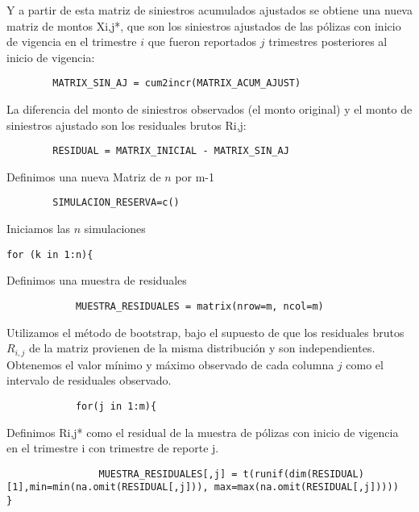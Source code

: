 \documentclass[11pt,twoside,openright,spanish]{report}
\numberwithin{equation}{chapter}
\numberwithin{figure}{chapter}
\numberwithin{table}{chapter}
\begin{document}
\vspace{0.3cm}
Y a partir de esta matriz de siniestros acumulados ajustados se obtiene una nueva matriz de montos Xi,j*, que son los siniestros ajustados de las pólizas con inicio de vigencia en el trimestre $i$ que fueron reportados $j$ trimestres posteriores al inicio de vigencia:
\begin{lstlisting}			
		MATRIX_SIN_AJ = cum2incr(MATRIX_ACUM_AJUST)
\end{lstlisting}

\vspace{0.3cm}
La diferencia del monto de siniestros observados (el monto original) y el monto de siniestros ajustado son los residuales brutos Ri,j:
\begin{lstlisting}			
		RESIDUAL = MATRIX_INICIAL - MATRIX_SIN_AJ
\end{lstlisting}

\vspace{0.3cm}
Definimos una nueva Matriz de $n$ por m-1
\begin{lstlisting}			
		SIMULACION_RESERVA=c()
\end{lstlisting}

\vspace{0.3cm}
Iniciamos las $n$ simulaciones
\begin{lstlisting}	
for (k in 1:n){
\end{lstlisting}

\vspace{0.3cm}
Definimos una muestra de residuales
\begin{lstlisting}			
			MUESTRA_RESIDUALES = matrix(nrow=m, ncol=m)
\end{lstlisting}

\vspace{0.3cm}
Utilizamos el método de bootstrap, bajo el supuesto de que los residuales brutos $R_{i,j}$ de la matriz provienen de la misma distribución y son independientes. Obtenemos el valor mínimo y máximo observado de cada columna $j$ como el intervalo de residuales observado.
\begin{lstlisting}				
			for(j in 1:m){
			\end{lstlisting}
				Definimos Ri,j* como el residual de la muestra de pólizas con inicio de vigencia en el trimestre i con trimestre de reporte j. 
				\begin{lstlisting}
				MUESTRA_RESIDUALES[,j] = t(runif(dim(RESIDUAL)[1],min=min(na.omit(RESIDUAL[,j])), max=max(na.omit(RESIDUAL[,j]))))			}
\end{lstlisting}
\end{document}
